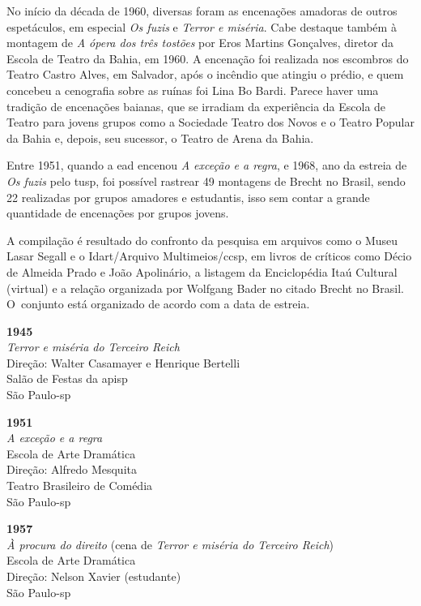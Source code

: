{No início da década de 1960, diversas foram as encenações amadoras de
outros espetáculos, em especial {\it Os fuzis} e {\it Terror e miséria}.
Cabe destaque também à montagem de {\it A ópera dos três tostões} por
Eros Martins Gonçalves, diretor da Escola de Teatro da Bahia, em 1960. A
encenação foi realizada nos escombros do Teatro Castro Alves, em
Salvador, após o incêndio que atingiu o prédio, e quem concebeu a
cenografia sobre as ruínas foi Lina Bo Bardi. Parece haver uma tradição
de encenações baianas, que se irradiam da experiência da Escola de
Teatro para jovens grupos como a Sociedade Teatro dos Novos e o Teatro
Popular da Bahia e, depois, seu sucessor, o Teatro de Arena da Bahia.

Entre 1951, quando a {\sc ead} encenou {\it A exceção e a regra}, e 1968, ano
da estreia de {\it Os fuzis} pelo {\sc tusp}, foi possível rastrear 49
montagens de Brecht no Brasil, sendo 22 realizadas por grupos amadores e
estudantis, isso sem contar a grande quantidade de encenações por grupos
jovens.

A compilação é resultado do confronto da pesquisa em arquivos como o
Museu Lasar Segall e o Idart/Arquivo Multimeios/{\sc ccsp}, em livros de
críticos como Décio de Almeida Prado e João Apolinário, a listagem da
Enciclopédia Itaú Cultural (virtual) e a relação organizada por Wolfgang
Bader no citado Brecht no Brasil. O~conjunto está organizado de acordo
com a data de estreia.

\start[itemize]
\item{\bf 1945}\\
{\it Terror e miséria do Terceiro Reich}\\
Direção: Walter Casamayer e Henrique Bertelli\\
Salão de Festas da {\sc apisp}\\
São Paulo-{\sc sp}

\item{\bf 1951}\\
{\it A exceção e a regra}\\
Escola de Arte Dramática\\
Direção: Alfredo Mesquita\\
Teatro Brasileiro de Comédia\\
São Paulo-{\sc sp}

\item{\bf 1957}\\
{\it À procura do direito} (cena de {\it Terror e miséria do Terceiro
Reich})\\
Escola de Arte Dramática\\
Direção: Nelson Xavier (estudante)\\
São Paulo-{\sc sp}

}

